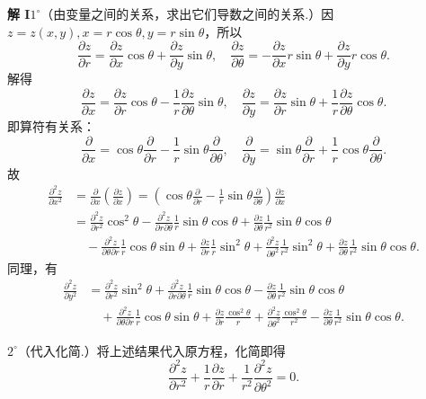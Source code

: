 \documentclass[UTF8,12pt,a4paper,fontset=fandol]{ctexart}
\begin{document}
\noindent\textbf{解 I}\quad $1^\circ$（由变量之间的关系，求出它们导数之间的关系.）因 $z=z(x,y),x=r\cos\theta,y=r\sin\theta$，所以
\[
  \frac{\partial z}{\partial r}=\frac{\partial z}{\partial x}\cos\theta+\frac{\partial z}{\partial y}\sin\theta,\quad
  \frac{\partial z}{\partial\theta}=-\frac{\partial z}{\partial x}r\sin\theta+\frac{\partial z}{\partial y}r\cos\theta. \tag{1}
\]
解得
\[
  \frac{\partial z}{\partial x}=\frac{\partial z}{\partial r}\cos\theta-\frac1r\frac{\partial z}{\partial\theta}\sin\theta,\quad
  \frac{\partial z}{\partial y}=\frac{\partial z}{\partial r}\sin\theta+\frac1r\frac{\partial z}{\partial\theta}\cos\theta. \tag{2}
\]
即算符有关系：
\[
  \frac{\partial}{\partial x}=\cos\theta\frac{\partial}{\partial r}-\frac1r\sin\theta\frac{\partial}{\partial\theta},\quad
  \frac{\partial}{\partial y}=\sin\theta\frac{\partial}{\partial r}+\frac1r\cos\theta\frac{\partial}{\partial\theta}. \tag{3}
\]
故
\[
\begin{aligned}
\frac{\partial^2 z}{\partial x^2}
&=\frac{\partial}{\partial x}\left(\frac{\partial z}{\partial x}\right)
=\left(\cos\theta\frac{\partial}{\partial r}-\frac1r\sin\theta\frac{\partial}{\partial\theta}\right)\frac{\partial z}{\partial x}\\
&=\frac{\partial^2z}{\partial r^2}\cos^2\theta
-\frac{\partial^2z}{\partial r\partial\theta}\frac1r\sin\theta\cos\theta
+\frac{\partial z}{\partial\theta}\frac1{r^2}\sin\theta\cos\theta\\
&\quad-\frac{\partial^2z}{\partial\theta\partial r}\frac1r\cos\theta\sin\theta
+\frac{\partial z}{\partial r}\frac1r\sin^2\theta
+\frac{\partial^2z}{\partial\theta^2}\frac1{r^2}\sin^2\theta
+\frac{\partial z}{\partial\theta}\frac1{r^2}\sin\theta\cos\theta.
\end{aligned}
\]
同理，有
\[
\begin{aligned}
\frac{\partial^2z}{\partial y^2}
&=\frac{\partial^2z}{\partial r^2}\sin^2\theta
+\frac{\partial^2z}{\partial r\partial\theta}\frac1r\sin\theta\cos\theta
-\frac{\partial z}{\partial\theta}\frac1{r^2}\sin\theta\cos\theta\\
&\quad+\frac{\partial^2z}{\partial\theta\partial r}\frac1r\cos\theta\sin\theta
+\frac{\partial z}{\partial r}\frac{\cos^2\theta}{r}
+\frac{\partial^2z}{\partial\theta^2}\frac{\cos^2\theta}{r^2}
-\frac{\partial z}{\partial\theta}\frac1{r^2}\sin\theta\cos\theta.
\end{aligned}
\]

$2^\circ$（代入化简.）将上述结果代入原方程，化简即得
\[
  \frac{\partial^2z}{\partial r^2}+\frac1r\frac{\partial z}{\partial r}
  +\frac1{r^2}\frac{\partial^2z}{\partial\theta^2}=0. \tag{4}
\]
\end{document}
